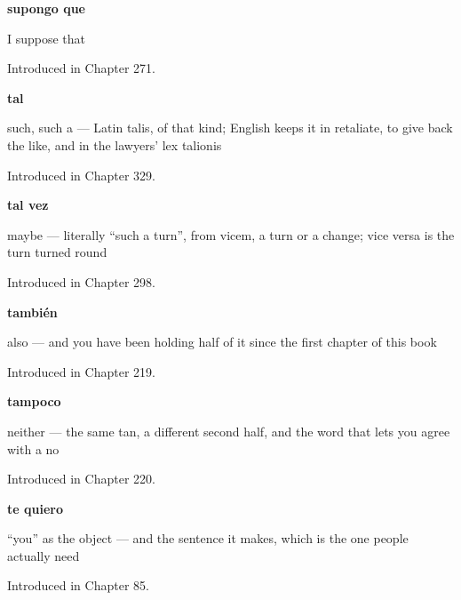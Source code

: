 \noindent\begin{minipage}[t]{\linewidth}
\raggedright
\textbf{supongo que}\par
\small I suppose that\par
\footnotesize Introduced in Chapter 271.
\end{minipage}\par\medskip

\noindent\begin{minipage}[t]{\linewidth}
\raggedright
\textbf{tal}\par
\small such, such a — Latin talis, of that kind; English keeps it in retaliate, to give back the like, and in the lawyers' lex talionis\par
\footnotesize Introduced in Chapter 329.
\end{minipage}\par\medskip

\noindent\begin{minipage}[t]{\linewidth}
\raggedright
\textbf{tal vez}\par
\small maybe — literally \textquotedblleft{}such a turn\textquotedblright{}, from vicem, a turn or a change; vice versa is the turn turned round\par
\footnotesize Introduced in Chapter 298.
\end{minipage}\par\medskip

\noindent\begin{minipage}[t]{\linewidth}
\raggedright
\textbf{también}\par
\small also — and you have been holding half of it since the first chapter of this book\par
\footnotesize Introduced in Chapter 219.
\end{minipage}\par\medskip

\noindent\begin{minipage}[t]{\linewidth}
\raggedright
\textbf{tampoco}\par
\small neither — the same tan, a different second half, and the word that lets you agree with a no\par
\footnotesize Introduced in Chapter 220.
\end{minipage}\par\medskip

\noindent\begin{minipage}[t]{\linewidth}
\raggedright
\textbf{te quiero}\par
\small \textquotedblleft{}you\textquotedblright{} as the object — and the sentence it makes, which is the one people actually need\par
\footnotesize Introduced in Chapter 85.
\end{minipage}\par\medskip

